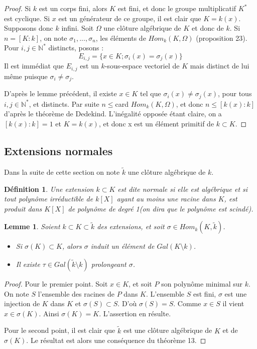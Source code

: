 \documentclass[12pt,a4paper]{report}
\newtheorem{lem}[thm]{\bf Lemme}
\newtheorem{defn}[thm]{\bf D\'efinition}
\begin{document}
\begin{proof}
Si $k$ est un corps fini, alors $K$ est fini, et donc le groupe multiplicatif $K^{*}$ est cyclique. Si $x$ est un générateur de ce groupe, il est clair que $K=k(x)$. Supposons donc $k$ infini. Soit $\Omega$ une clôture algébrique de $K$ et donc de $k$. Si $n=[K:k]$, on note $\sigma_1,...,\sigma_n$, les éléments de $Hom_k(K,\Omega)$ (proposition 23). Pour $i,j\in \mathbb{N}^{*}$ distincts, posons : 
$$E_{i,j}=\{x\in K ; \sigma_i(x)=\sigma_j(x)\}$$
Il est immédiat que $E_{i,j}$ est un $k$-sous-espace vectoriel de $K$ mais distinct de lui même puisque $\sigma_i \neq \sigma_j$. 

D'après le lemme précédent, il existe $x \in K$ tel que $\sigma_i(x)\neq\sigma_j(x)$, pour tous $i,j \in \mathbb{N}^{*}$, et distincts. Par suite $n \leq $card $Hom_k(K,\Omega)$, et donc $n\leq [k(x):k]$ d'après le théorème de Dedekind. L'inégalité opposée étant claire, on a $[k(x) : k]=1$ et $K=k(x)$, et donc x est un élément primitif de $k \subset K$. 
\end{proof}


\subsection{Extensions normales}
Dans la suite de cette section on note $\tilde{k}$ une clôture algébrique de $k$. 

\begin{defn}\rm
Une extension $k\subset K$ est dite normale si elle est algébrique et si tout polynôme irréductible de $k[X]$ ayant au moins une racine dans $K$, est produit dans $K[X]$ de polynôme de degré 1(on dira que le polynôme est scindé). 
\end{defn}

\begin{lem}\rm
Soient $k\subset K\subset \tilde{k}$ des extensions, et soit $\sigma \in Hom_k(K,\tilde{k})$. 
\begin{itemize}
\item Si $\sigma(K)\subset K$, alors $\sigma$ induit un élément de $Gal(K\setminus k)$.
\item Il existe $\tau \in Gal(\tilde{k}\setminus k)$ prolongeant $\sigma$. 
\end{itemize} 
\end{lem}

\begin{proof}
Pour le premier point. Soit $ x \in K$, et soit $P$ son polynôme minimal sur $k$. On note $S$ l'ensemble des racines de $P$ dans $K$. L'ensemble $S$ est fini, $\sigma$ est une injection de $K$ dans $K$ et $\sigma(S)\subset S$. D'où $\sigma(S)=S$. Comme $x\in S$ il vient $x \in  \sigma(K).$ Ainsi $\sigma(K)=K$. L'assertion en résulte. 

Pour le second point, il est clair que $\tilde{k}$ est une clôture algébrique de $K$ et de $\sigma(K)$. Le résultat est alors une conséquence du théorème 13.  
\end{proof}
\end{document}
